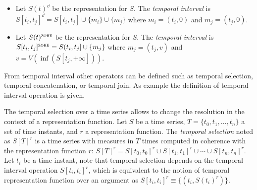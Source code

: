 \begin{itemize}
\item Let $S(t)^\dd$ be the \dd{} representation for $S$. The
  \emph{\dd{} temporal interval} is $S[t_i,t_j]^\dd = S[t_i,t_j]
  \cup \{m_i\} \cup \{m_j\}$ where $m_i=(t_i,0)$ and $m_j=(t_j,0)$.

\item Let $S(t)^\zohe{}$ be the \zohe{} representation for $S$. The
  \emph{\zohe{} temporal interval} is $S[t_i,t_j]^\zohe{} = S(t_i,t_j]
  \cup \{m_j\}$ where $m_j=(t_j,v)$ and $v= V(\inf( S[t_j,+\infty] ))$.
\end{itemize}



From temporal interval other operators can be defined such as temporal
selection, temporal concatenation, or temporal join. As example the
definition of temporal interval operation is given.


The temporal selection over a time series allows to change the
resolution in the context of a representation function.  Let $S$ be a
time series, $T=\{t_0,t_1,\dotsc,t_n\}$ a set of time instants, and
$r$ a representation function. The \emph{temporal selection} noted as
$S[T]^r$ is a time series with measures in $T$ times computed in
coherence with the representation function $r$: $S[T]^r = S[t_0,t_0]^r
\cup S[t_1,t_1]^r \cup \dotsb \cup S[t_n,t_n]^r$. Let $t_i$ be a time
instant, note that temporal selection depends on the temporal interval
operation $S[t_i,t_i]^r$, which is equivalent to the notion of
temporal representation function over an argument as $S[t_i,t_i]^r
\equiv \{ (t_i, S(t_i)^r) \}$.


%



